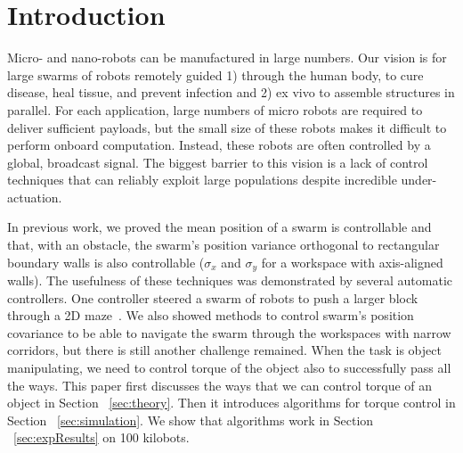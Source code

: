 \section{Introduction}\label{sec:Intro}
Micro- and nano-robots can be manufactured in large numbers.
Our vision is for large swarms of robots remotely guided 1) through the human body, to cure disease, heal tissue, and prevent infection and 2) ex vivo to assemble structures in parallel. 
 For each application, large numbers of micro robots are required  to deliver sufficient payloads, but the small size of these robots makes it difficult to perform onboard computation.  Instead, these robots are often controlled by a global, broadcast signal. 
 The biggest barrier to this vision is a lack of control techniques that can reliably exploit large populations despite incredible under-actuation.  
 



In previous work, we proved the mean position of a swarm is controllable and that, with an obstacle, the swarm's position variance orthogonal to rectangular boundary walls  is also controllable
($\sigma_x$ and $\sigma_y$ for a workspace with axis-aligned walls). 
The usefulness of these techniques was demonstrated by several automatic controllers. One controller steered a swarm of robots to push a larger block through a 2D maze~\cite{ShahrokhiIROS2015}. 
We also showed methods to control swarm's position covariance to be able to navigate the swarm through the workspaces with narrow corridors, but there is still another challenge remained. When the task is object manipulating, we need to control torque of the object also to successfully pass all the ways. 
This paper first discusses the ways that we can control torque of an object in Section ~\ref{sec:theory}. Then it introduces algorithms for torque control in Section ~\ref{sec:simulation}. We show that algorithms work in Section ~\ref{sec:expResults} on 100 kilobots.



